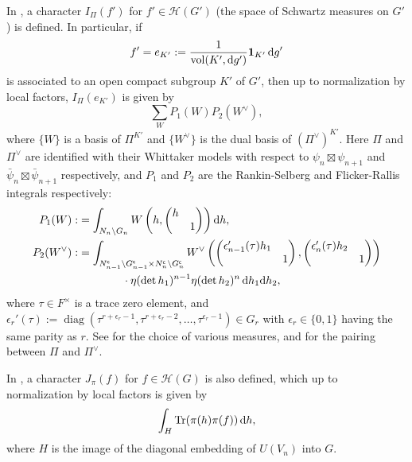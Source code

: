 \documentclass[11pt, a4paper]{amsart}
\newcommand{\bs}{\backslash}
\newcommand{\diag}{\operatorname{diag}}
\newcommand{\od}{\operatorname{d}}
\newcommand{\be}{\begin {equation}}
\newcommand{\ee}{\end {equation}}
\theoremstyle{plain}
\theoremstyle{plain}
\theoremstyle{plain}
\theoremstyle{plain}
\theoremstyle{remark}
\theoremstyle{definition}
\theoremstyle{plain}
\numberwithin{equation}{section}
\begin{document}
In \cite[\S3.2]{DZ}, a character $I_\Pi(f')$ for $f'\in \mathscr{H}(G')$ (the space of Schwartz measures on $G'$) is defined. In particular, if 
\[
f'= e_{K'}:= \frac{1}{{\rm vol}(K', \od\!g')} {\bf 1}_{K'}\od\!g'
\]
is associated to an open compact subgroup $K'$ of $G'$, then up to normalization  by local factors, $I_\Pi(e_{K'})$ is given by
\be \label{trace}
\sum_W P_1(W)P_2(W^\vee),
\ee
where $\{W\}$ is a basis of $\Pi^{K'}$ and $\{{W^\vee}\}$ is the dual basis of $(\Pi^\vee)^{K'}$. Here $\Pi$ and $\Pi^\vee$ are identified with their Whittaker models with respect to $\psi_n\boxtimes\psi_{n+1}$ and $\bar\psi_n\boxtimes\bar\psi_{n+1}$ respectively, and $P_1$ and $P_2$ are the Rankin-Selberg and Flicker-Rallis integrals respectively:  
\[
\begin{aligned}
P_1(W):& = \int_{N_n\bs G_n} W\left(h, \begin{pmatrix} h \\ & 1\end{pmatrix}\right)\od\!h, \\
P_2(W^\vee):& =\int_{N_{n-1}^{\sf c}\bs G_{n-1}^{\sf c}\times N_{n}^{\sf c}\bs G_{n}^{\sf c} } W^\vee \left( \begin{pmatrix} \epsilon_{n-1}'(\tau)h_1 \\ & 1 \end{pmatrix}, \begin{pmatrix} \epsilon_{n}'(\tau) h_2 \\ & 1\end{pmatrix}\right) \\
&\qquad\qquad \cdot \eta(\det h_1)^{n-1} 
\eta(\det h_2)^n \od\!h_1\!\od\!h_2,
\end{aligned}
\]
where $\tau\in F^\times$ is a trace zero element, and 
$
\epsilon_r'(\tau) := \diag(\tau^{r+\epsilon_r-1}, \tau^{r+\epsilon_r-2},\ldots, \tau^{\epsilon_r-1})\in G_r
$
with $\epsilon_r \in \{0,1\}$ having the same parity as $r$. See \cite[\S2]{DZ} for the choice of various measures, and \cite[\S3.2.2]{DZ} for the pairing between $\Pi$ and $\Pi^\vee$.

In \cite[\S3.4]{DZ}, a character $J_\pi(f)$ for $f\in \mathscr{H}(G)$ is also defined, which up to normalization by local factors is given by
\[
\int_{H} {\rm Tr} (\pi(h)\pi(f))\od\! h,
\]
where $H$ is the image of the diagonal embedding of $U(V_n)$ into $G$. 
\end{document}
